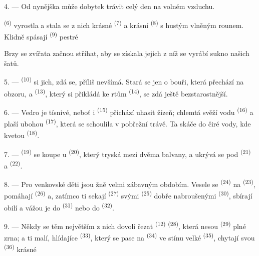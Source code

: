 4. --- Od nynějška může dobytek trávit celý den na volném vzduchu.

 \textsuperscript{(6)} vyrostla a stala se z nich krásné 
\textsuperscript{(7)} a krásní  \textsuperscript{(8)} s hustým vlněným
rounem. Klidně spásají   \textsuperscript{(9)} pestré

Brzy se  zvířata začnou stříhat, aby se získala jejich  z níž
se vyrábí sukno našich šatů.

\VUsaut{5.0mm}
\VUsaut{3.4mm}

5. ---  \textsuperscript{(10)} si jich, zdá se, příliš nevšímá. Stará se
jen o bouři, která přechází na obzoru, a 
\textsuperscript{(13)}, který si přikládá ke rtům 
\textsuperscript{(14)}, se zdá ještě bezstarostnější.

6. --- Vedro je tísnivé, neboť i  \textsuperscript{(15)} přichází uhasit
žízeň; chlemtá svěží vodu  \textsuperscript{(16)} a plaší ubohou
 \textsuperscript{(17)}, která se schoulila v pobřežní trávě. Ta skáče do
čiré vody, kde kvetou  \textsuperscript{(18)}.

7. ---  \textsuperscript{(19)} se koupe u 
\textsuperscript{(20)}, který tryská mezi dvěma balvany, a ukrývá se pod
 \textsuperscript{(21)} a 
\textsuperscript{(22)}.

\VUsaut{5.0mm}
\VUsaut{3.4mm}

8. --- Pro venkovské děti jsou žně velmi zábavným obdobím. Vesele se
 \textsuperscript{(24)} na 
\textsuperscript{(23)}, pomáhají  \textsuperscript{(26)} a, zatímco ti
sekají  \textsuperscript{(27)} svými 
\textsuperscript{(25)} dobře nabroušenými  \textsuperscript{(30)},
sbírají obilí a vážou je do  \textsuperscript{(31)} nebo do
 \textsuperscript{(32)}.

9. --- Někdy se těm největším z nich dovolí řezat 
\textsuperscript{(12)}  \textsuperscript{(28)}, která nesou
 \textsuperscript{(29)} plné zrna; a ti malí, hlídajíce 
\textsuperscript{(33)}, který se pase na  \textsuperscript{(34)} ve
stínu velké  \textsuperscript{(35)}, chytají svou 
\textsuperscript{(36)} krásné 

